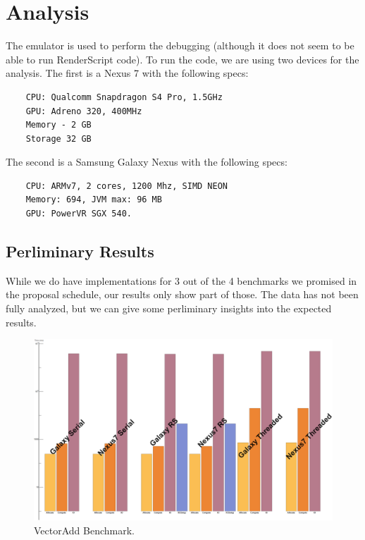 \section*{Analysis}
\label{sec:analysis}

The emulator is used to perform the debugging (although it does not seem to be able to run RenderScript code).
To run the code, we are using two devices for the analysis.
The first is a Nexus 7 with the following specs:

\begin{verbatim}
    CPU: Qualcomm Snapdragon S4 Pro, 1.5GHz
    GPU: Adreno 320, 400MHz
    Memory - 2 GB
    Storage 32 GB
\end{verbatim}

The second is a Samsung Galaxy Nexus with the following specs:

\begin{verbatim}
    CPU: ARMv7, 2 cores, 1200 Mhz, SIMD NEON
    Memory: 694, JVM max: 96 MB
    GPU: PowerVR SGX 540.
\end{verbatim}


\subsection*{Perliminary Results}

While we do have implementations for 3 out of the 4 benchmarks we promised in the proposal schedule,
  our results only show part of those.
The data has not been fully analyzed, but we can give some perliminary insights into the expected
  results.


\begin{figure}[t!]
\includegraphics[scale=0.125]{VectorAdd.png}
\caption{VectorAdd Benchmark.}
\label{fig:vecadd}
\centering
\end{figure}



